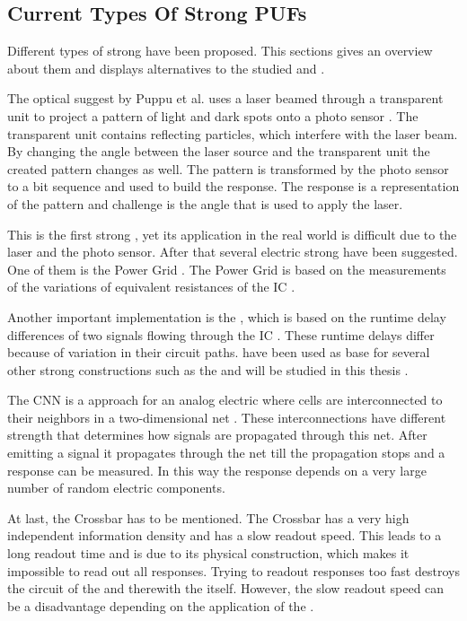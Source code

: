 \subsection{Current Types Of Strong PUFs}
\label{sec:typesofpufs}

Different types of strong \pufs have been proposed.
This sections gives an overview about them and displays alternatives to the studied \apuf and \xpuf. 

The optical \puf suggest by Puppu et al. uses a laser beamed through a transparent unit to project a pattern of light and dark spots onto a photo sensor \cite{Pappu2001PhysicalFunctions}.
The transparent unit contains reflecting particles, which interfere with the laser beam.
By changing the angle between the laser source and the transparent unit the created pattern changes as well.
The pattern is transformed by the photo sensor to a bit sequence and used to build the response.
The \puf response is a representation of the pattern and challenge is the angle that is used to apply the laser.

This is the first strong \puf, yet its application in the real world is difficult due to the laser and the photo sensor.
After that several electric strong \puf have been suggested.\\
One of them is the Power Grid \puf.
The Power Grid \puf is based on the measurements of the variations of equivalent resistances of the \ac{IC} \cite{Helinski2009AVariations}.

Another important implementation is the \apuf, which is based on the runtime delay differences of two signals flowing through the \ac{IC}  \cite{Ruhrmair2010StrongProofs}.
These runtime delays differ because of variation in their circuit paths.
\apufs have been used as base for several other strong \puf constructions such as the \xpuf and will be studied in this thesis \cite{Becker2015ThePUFs}.

The \ac{CNN} \puf is a approach for an analog electric \puf where cells are interconnected to their neighbors in a two-dimensional net \cite{Csaba2010ApplicationCryptography}.
These interconnections have different strength that determines how signals are propagated through this net.
After emitting a signal it propagates through the net till the propagation stops and a response can be measured.
In this way the response depends on a very large number of random electric components.

At last, the Crossbar \puf has to be mentioned.
The Crossbar \puf has a very high independent information density and has a slow readout speed.
This leads to a long readout time and is due to its physical construction, which makes it impossible to read out all responses. 
Trying to readout responses too fast destroys the circuit of the \puf and therewith the \puf itself.
However, the slow readout speed can be a disadvantage depending on the application of the \puf \cite{Ruhrmair2010StrongProofs}.

